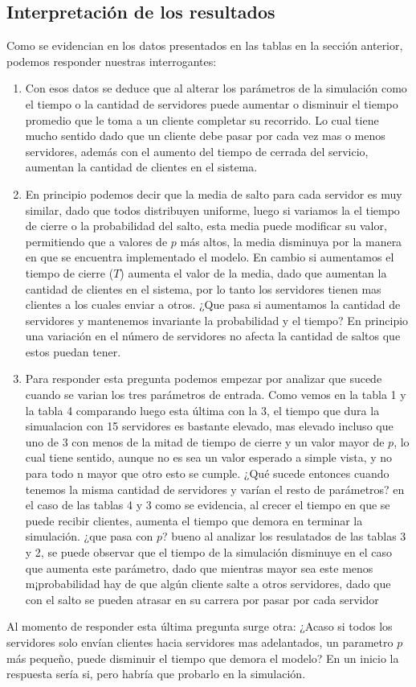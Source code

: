 \documentclass{article}
\begin{document}
\subsection{Interpretación de los resultados}
Como se evidencian en los datos presentados en las tablas en la sección anterior, podemos responder nuestras interrogantes:
\begin{enumerate}
\item{Con esos datos se deduce que al alterar los parámetros de la simulación como el tiempo o la cantidad de servidores puede aumentar o disminuir el tiempo promedio que le toma a un cliente completar su recorrido. Lo cual tiene mucho sentido dado que un cliente debe pasar por cada vez mas o menos servidores, además con el aumento del tiempo de cerrada del servicio, aumentan la cantidad de clientes en el sistema.}
\item{En principio podemos decir que la media de salto para cada servidor es muy similar, dado que todos distribuyen uniforme, luego si variamos la el tiempo de cierre o la probabilidad del salto, esta media puede modificar su valor, permitiendo que a valores de $p$ más altos, la media disminuya por la manera en que se encuentra implementado el modelo. En cambio si aumentamos el tiempo de cierre ($T$) aumenta el valor de la media, dado que aumentan la cantidad de clientes en el sistema, por lo tanto los servidores tienen mas clientes a los cuales enviar a otros. ¿Que pasa si aumentamos la cantidad de servidores y mantenemos invariante la probabilidad y el tiempo? En principio una variación en el número de servidores no afecta la cantidad de saltos que estos puedan tener.}
\item{Para responder esta pregunta podemos empezar por analizar que sucede cuando se varian los tres parámetros de entrada. Como vemos en la tabla 1 y la tabla 4 comparando luego esta última con la 3, el tiempo que dura la simualacion con 15 servidores es bastante elevado, mas elevado incluso que uno de 3 con menos de la mitad de tiempo de cierre y un valor mayor de $p$, lo cual tiene sentido, aunque no es sea un valor esperado a simple vista, y no para todo n mayor que otro esto se cumple. ¿Qué sucede entonces cuando tenemos la misma cantidad de servidores  y varían el resto de parámetros? en el caso de las tablas 4 y 3  como se evidencia, al crecer el tiempo en que se puede recibir clientes, aumenta el tiempo que demora en terminar la simulación. ¿que pasa con $p$? bueno al analizar los resulatados de las tablas 3 y 2, se puede observar que el tiempo de la simulación disminuye en el caso que aumenta este parámetro, dado que mientras mayor sea este menos m¡probabilidad hay de que algún cliente salte a otros servidores, dado que con el salto se pueden atrasar en su carrera por pasar por cada servidor}
\end{enumerate}
Al momento de responder esta última pregunta surge otra: ¿Acaso si todos los servidores solo envían clientes hacia servidores mas adelantados, un parametro $p$ más pequeño, puede disminuir el tiempo que demora el modelo? En un inicio la respuesta sería si, pero habría que probarlo en la simulación.
\end{document}
